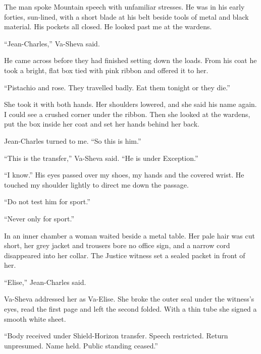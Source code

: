 The man spoke Mountain speech with unfamiliar stresses. He was in his early forties, sun-lined, with a short blade at his belt beside tools of metal and black material. His pockets all closed. He looked past me at the wardens.\par

``Jean-Charles,'' Va-Sheva said.\par

He came across before they had finished setting down the loads. From his coat he took a bright, flat box tied with pink ribbon and offered it to her.\par

``Pistachio and rose. They travelled badly. Eat them tonight or they die.''\par

She took it with both hands. Her shoulders lowered, and she said his name again. I could see a crushed corner under the ribbon. Then she looked at the wardens, put the box inside her coat and set her hands behind her back.\par

Jean-Charles turned to me. ``So this is him.''\par

``This is the transfer,'' Va-Sheva said. ``He is under Exception.''\par

``I know.'' His eyes passed over my shoes, my hands and the covered wrist. He touched my shoulder lightly to direct me down the passage.\par

``Do not test him for sport.''\par

``Never only for sport.''\par

In an inner chamber a woman waited beside a metal table. Her pale hair was cut short, her grey jacket and trousers bore no office sign, and a narrow cord disappeared into her collar. The Justice witness set a sealed packet in front of her.\par

``Elise,'' Jean-Charles said.\par

Va-Sheva addressed her as Va-Elise. She broke the outer seal under the witness's eyes, read the first page and left the second folded. With a thin tube she signed a smooth white sheet.\par

``Body received under Shield-Horizon transfer. Speech restricted. Return unpresumed. Name held. Public standing ceased.''\par

